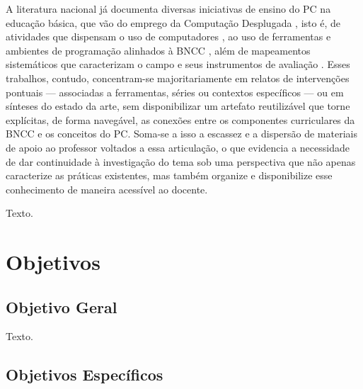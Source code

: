 A literatura nacional já documenta diversas iniciativas de ensino do PC na educação básica, que vão do emprego da Computação Desplugada \cite{silvamadeira2024}, isto é, de atividades que dispensam o uso de computadores \cite[p.~50]{brackmann2017}, ao uso de ferramentas e ambientes de programação alinhados à BNCC \cite{osorio2025}, além de mapeamentos sistemáticos que caracterizam o campo e seus instrumentos de avaliação \cite{rege2023, kohler2025}. Esses trabalhos, contudo, concentram-se majoritariamente em relatos de intervenções pontuais --- associadas a ferramentas, séries ou contextos específicos --- ou em sínteses do estado da arte, sem disponibilizar um artefato reutilizável que torne explícitas, de forma navegável, as conexões entre os componentes curriculares da BNCC e os conceitos do PC. Soma-se a isso a escassez e a dispersão de materiais de apoio ao professor voltados a essa articulação, o que evidencia a necessidade de dar continuidade à investigação do tema sob uma perspectiva que não apenas caracterize as práticas existentes, mas também organize e disponibilize esse conhecimento de maneira acessível ao docente.

Texto.


\section{Objetivos}
\label{sec-intro-obj}

\subsection{Objetivo Geral}
\label{sec-intro-obj-geral}

Texto.

\subsection{Objetivos Específicos}
\label{sec-intro-obj-especificos}

